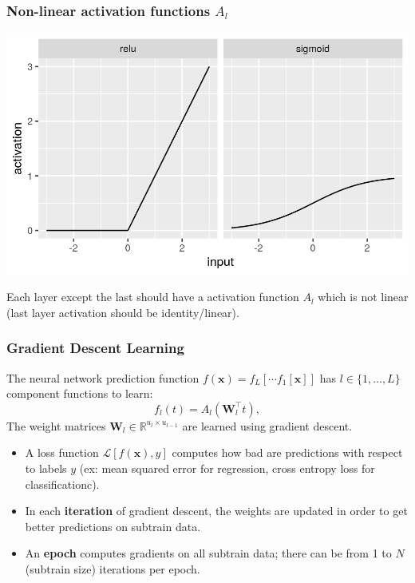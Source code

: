 \documentclass{beamer}
\begin{document}
\begin{frame}
  \frametitle{Non-linear activation functions $A_l$}
  \includegraphics[width=\textwidth]{figure-activations}

Each layer except the last should have a activation function $A_l$
which is not linear (last layer activation should be identity/linear).
\end{frame}

\begin{frame}
  \frametitle{Gradient Descent Learning}

  The neural network prediction function
  $f(\mathbf x) = f_L[\cdots f_1[\mathbf x] ]$ has $l\in\{1,\dots,L\}$
  component functions to learn:
\begin{equation}
  f_l(t) = A_l( \mathbf W_l^\intercal t ),
\end{equation}
The weight matrices $\mathbf W_l\in\mathbb R^{u_l\times u_{l-1}}$ are
learned using gradient descent.
\begin{itemize}
\item A loss function $\mathcal L[f(\mathbf x), y]$ computes how bad
  are predictions with respect to labels $y$ (ex: mean squared error
  for regression, cross entropy loss for classificationc).
\item In each \textbf{iteration} of gradient descent, the weights are
  updated in order to get better predictions on subtrain data.
\item An \textbf{epoch} computes gradients on all subtrain data;
  there can be from 1 to $N$(subtrain size) iterations per epoch.
\end{itemize}
\end{frame}
\end{document}
